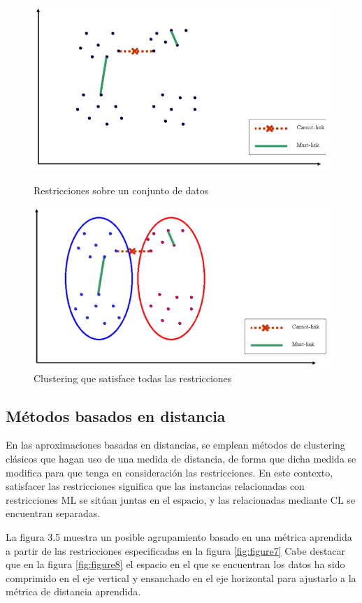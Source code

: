 \begin{figure}[bth]
	\myfloatalign
	{\includegraphics[width=.6\linewidth]{imagenes/c3/InputInstancesAndConst1}
	\caption{Restricciones sobre un conjunto de datos \cite{Survey:2007}} \label{fig:figure5}
	}
	{\includegraphics[width=.6\linewidth]{imagenes/c3/ClusteringSatAll}
	\caption{Clustering que satisface todas las restricciones \cite{Survey:2007}} \label{fig:figure6}
	}
\end{figure}

\subsection{Métodos basados en distancia}

En las aproximaciones basadas en distancias, se emplean métodos de clustering clásicos que hagan uso de una medida de distancia, de forma que dicha medida se modifica para que tenga en consideración las restricciones. En este contexto, satisfacer las restricciones significa que las instancias relacionadas con restricciones \acf{ML} se sitúan juntas en el espacio, y las relacionadas mediante \acf{CL} se encuentran separadas.

La figura 3.5 muestra un posible agrupamiento basado en una métrica aprendida a partir de las restricciones especificadas en la figura \ref{fig:figure7} Cabe destacar que en la figura \ref{fig:figure8} el espacio en el que se encuentran los datos ha sido comprimido en el eje vertical y ensanchado en el eje horizontal para ajustarlo a la métrica de distancia aprendida.

